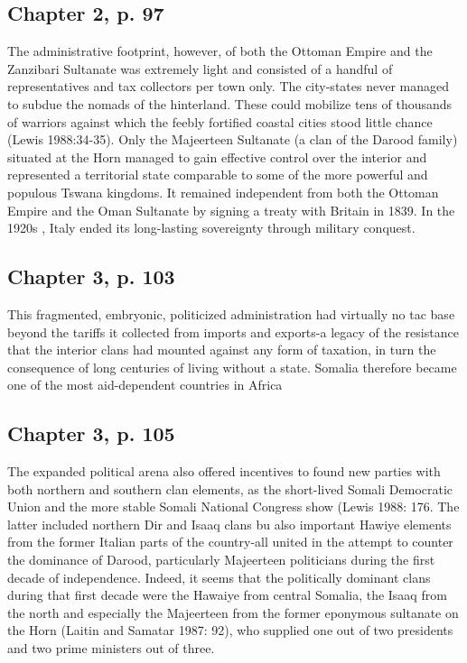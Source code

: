 \documentclass[12pt]{article}
\begin{document}
\subsection{Chapter 2, p. 97}
The administrative footprint, however, of both the Ottoman Empire and the
Zanzibari Sultanate was extremely light and consisted of a handful of
representatives and tax collectors per town only.  The city-states never managed
to subdue the nomads of the hinterland.  These could mobilize tens of thousands
of warriors against which the feebly fortified coastal cities stood little
chance (Lewis 1988:34-35).  Only the Majeerteen Sultanate (a clan of the Darood
family) situated at the Horn managed to gain effective control over the interior
and represented a territorial state comparable to some of the more powerful and
populous Tswana kingdoms.  It remained independent from both the Ottoman Empire
and the Oman Sultanate by signing a treaty with Britain in 1839.  In the 1920s ,
Italy ended its long-lasting sovereignty through military conquest.

\subsection{Chapter 3, p. 103}

This fragmented, embryonic, politicized administration had virtually no tac base
beyond the tariffs it collected from imports and exports-a legacy of the
resistance that the interior clans had mounted against any form of taxation, in
turn the consequence of long centuries of living without a state.  Somalia
therefore became one of the most aid-dependent countries in Africa

\subsection{Chapter 3, p. 105}

The expanded political arena also offered incentives to found new parties with
both northern and southern clan elements, as the short-lived Somali Democratic
Union and the more stable Somali National Congress show (Lewis 1988: 176.  The
latter included northern Dir and Isaaq clans bu also important Hawiye elements
from the former Italian parts of the country-all united in the attempt to
counter the dominance of Darood, particularly Majeerteen politicians during the
first decade of independence.  Indeed, it seems that the politically dominant
clans during that first decade were the Hawaiye from central Somalia, the Isaaq
from the north and especially the Majeerteen from the former eponymous sultanate
on the Horn (Laitin and Samatar 1987: 92), who supplied one out of two
presidents and two prime ministers out of three.
\end{document}
